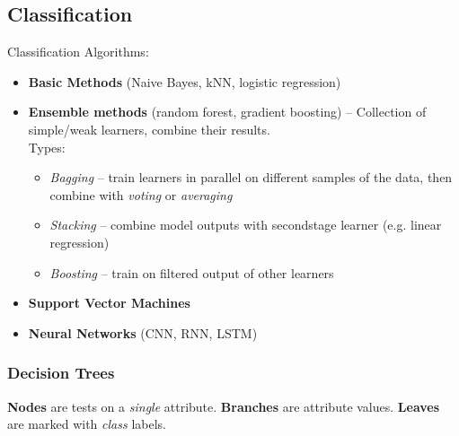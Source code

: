 \subsection{Classification} %
\label{sub:classification}
  Classification Algorithms:
  \begin{itemize}
    \item \textbf{Basic Methods} (Naive Bayes, kNN, logistic regression)
    \item \textbf{Ensemble methods} (random forest, gradient boosting) -- Collection of simple/weak learners, combine their results. \\Types:
    \begin{itemize}
      \item \emph{Bagging} -- train learners in parallel on different samples of the data, then combine with \emph{voting} or \emph{averaging}
      \item \emph{Stacking} -- combine model outputs with secondstage learner (e.g. linear regression)
      \item \emph{Boosting} -- train on filtered output of other learners
    \end{itemize}
    \item \textbf{Support Vector Machines}
    \item \textbf{Neural Networks} (CNN, RNN, LSTM)
  \end{itemize}
  \subsubsection{Decision Trees} %
  \label{ssub:decision_trees}
    \textbf{Nodes} are tests on a \emph{single} attribute. \textbf{Branches} are attribute values. \textbf{Leaves} are marked with \emph{class} labels.

